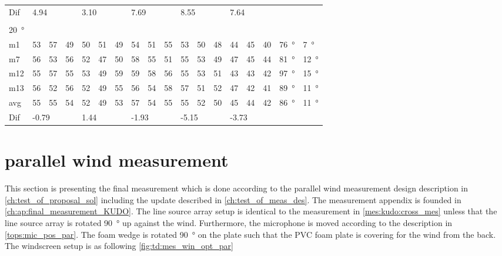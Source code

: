 \begin{table}[H]
\begin{tabular}{l|l|l|l|l|l|l|l|l|l|l|l|l|l|l|l|l|l}
Dif & \multicolumn{3}{l|}{4.94} & \multicolumn{3}{l|}{3.10} & \multicolumn{3}{l|}{7.69} & \multicolumn{3}{l|}{8.55} &  \multicolumn{3}{l|}{7.64} & \multicolumn{2}{l}{} \\ 
 \multicolumn{18}{l}{ } \\                             
\SI{20}{\degree}   & \multicolumn{3}{l|}{} & \multicolumn{3}{l|}{} & \multicolumn{3}{l|}{} & \multicolumn{3}{l|}{} &  \multicolumn{3}{l|}{}   & \multicolumn{2}{l}{} \\  \hline
m1    &53      &  57    &  49    &   50   &  51    &  49    &  54    &   51    &  55    &    53   &  50    &  48    & 44 & 45 &40   & \SI{76}{\degree} & \SI{7}{\degree}   \\
m7    & 56     &  53    &  56    &   52   &  47    &   50   &   58   &   55    &  51    &    55   & 53     &  49    & 47 & 45 &44   & \SI{81}{\degree} & \SI{12}{\degree}   \\
m12  & 55     &  57    &  55    &  53    &  49    &   59   &   59   &   58    &   56   &   55    &  53    & 51     & 43 & 43 & 42   & \SI{97}{\degree} & \SI{15}{\degree}  \\
m13  &  56    &  52    &  56    &  52    &  49    &   55   &   56   &   54    &  58    &   57    &  51    &  52    & 47 & 42 & 41   & \SI{89}{\degree} & \SI{11}{\degree}  \\ \hline
avg &  55    & 55     &   54   &  52    & 49     &  53    &  57    &  54     &  55    &  55     &   52   & 50     & 45 & 44  &42   & \SI{86}{\degree} & \SI{11}{\degree}   \\ \hline  
Dif & \multicolumn{3}{l|}{-0.79} & \multicolumn{3}{l|}{1.44} & \multicolumn{3}{l|}{-1.93} & \multicolumn{3}{l|}{-5.15} &  \multicolumn{3}{l|}{-3.73}      & \multicolumn{2}{l}{}                         
\end{tabular}
\end{table}

\newpage
\section{parallel wind measurement}\label{mes:kudo:par_mes}
This section is presenting the final measurement which is done according to the parallel wind measurement design description in \autoref{ch:test_of_proposal_sol} including the update described in \autoref{ch:test_of_meas_des}. The measurement appendix is founded in \autoref{ch:ap:final_measurement_KUDO}. The line source array setup is identical to the measurement in \autoref{mes:kudo:cross_mes} unless that the line source array is rotated \SI{90}{\degree} up against the wind. Furthermore, the microphone is moved according to the description in \autoref{tops:mic_pos_par}. The foam wedge is rotated \SI{90}{\degree} on the plate such that the PVC foam plate is covering for the wind from the back. The windscreen setup is as following \autoref{fig:td:mes_win_opt_par}   

